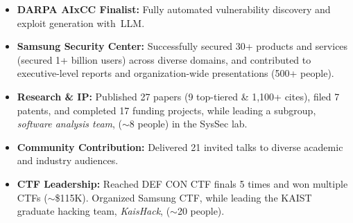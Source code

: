 \begin{itemize}[topsep=-1pt,itemsep=0pt,parsep=0pt,partopsep=0pt,leftmargin=1em]

\item 
\textbf{DARPA AIxCC Finalist:} Fully automated vulnerability discovery and exploit generation with~LLM.

\item
\textbf{Samsung Security Center:}
Successfully secured 30+ products and services (secured 1+ billion users) across diverse domains,
and contributed to executive-level reports and organization-wide presentations (500+ people).

\item
\textbf{Research \& IP:}
Published 27 papers (9 top-tiered \& 1,100+ cites),
filed 7 patents, and completed 17 funding projects,
while leading a subgroup, \emph{software analysis team}, ($\sim$8 people) in the SysSec lab.

\item
\textbf{Community Contribution:}
Delivered 21 invited talks to diverse academic and industry audiences.

\item
\textbf{CTF Leadership:}
Reached DEF CON CTF finals 5 times and won multiple CTFs ($\sim$\$115K).
Organized Samsung CTF, while leading the KAIST graduate hacking team, \emph{KaisHack}, ($\sim$20 people).

\end{itemize}



